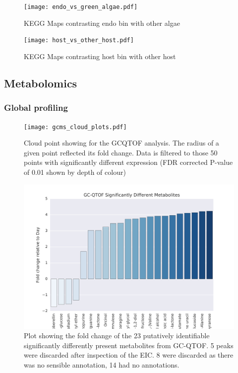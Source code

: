 \begin{figure}
    \texttt{[image: endo\_vs\_green\_algae.pdf]}
    \caption[KEGG Maps of Endosymbiont Bin Compared with Other Algae]{
    KEGG Maps contrasting endo bin with other algae}
\end{figure}

\begin{figure}
    \texttt{[image: host\_vs\_other\_host.pdf]}
    \caption[KEGG Maps of Host Bin Compared with Other \textit{Paramecium}]{
    KEGG Maps contrasting host bin with other host}
\end{figure}

\subsection{Metabolomics} 

\subsubsection{Global profiling}



\begin{figure}
    \texttt{[image: gcms\_cloud\_plots.pdf]}
    \caption[GCQTOF Cloud Plot]{Cloud point showing for the GCQTOF analysis. 
    The radius of a given point reflected its fold change.
    Data is filtered to those 50 points with significantly 
different expression (FDR corrected P-value of 0.01 shown by 
depth of colour)}
    \label{fig:gcms_clouds}
\end{figure}


\begin{figure}
    \includegraphics{GCMS_metabolites.svg}
    \caption[Plot of Identifiable GC-QTOF Metabolites]{Plot showing the
        fold change of the 23 putatively identifiable significantly
        differently present metabolites from GC-QTOF. 5 peaks
        were discarded after inspection of the EIC. 8 were discarded
    as there was no sensible annotation, 14 had no annotations.}
    \label{fig:gcms_metabolites}
\end{figure}



